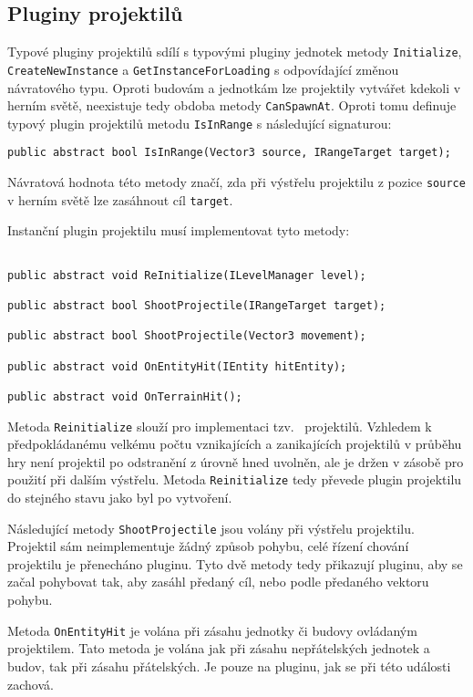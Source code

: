\subsection{Pluginy projektilů}
Typové pluginy projektilů sdílí s typovými pluginy jednotek metody \texttt{Initialize}, \texttt{CreateNewInstance} a \texttt{GetInstanceForLoading} s odpovídající změnou návratového typu. Oproti budovám a jednotkám lze projektily vytvářet kdekoli v herním světě, neexistuje tedy obdoba metody \texttt{CanSpawnAt}. Oproti tomu definuje typový plugin projektilů metodu \texttt{IsInRange} s následující signaturou:

\begin{lstlisting}
public abstract bool IsInRange(Vector3 source, IRangeTarget target);
\end{lstlisting}

Návratová hodnota této metody značí, zda při výstřelu projektilu z pozice \texttt{source} v herním světě lze zasáhnout cíl \texttt{target}.

Instanční plugin projektilu musí implementovat tyto metody:
\begin{lstlisting}

public abstract void ReInitialize(ILevelManager level);

public abstract bool ShootProjectile(IRangeTarget target);

public abstract bool ShootProjectile(Vector3 movement);

public abstract void OnEntityHit(IEntity hitEntity);

public abstract void OnTerrainHit();
\end{lstlisting}


Metoda \texttt{Reinitialize} slouží pro implementaci tzv.~ projektilů. Vzhledem k předpokládanému velkému počtu vznikajících a zanikajících projektilů v průběhu hry není projektil po odstranění z úrovně hned uvolněn, ale je držen v zásobě pro použití při dalším výstřelu. Metoda \texttt{Reinitialize} tedy převede plugin projektilu do stejného stavu jako byl po vytvoření.

Následující metody \texttt{ShootProjectile} jsou volány při výstřelu projektilu. Projektil sám neimplementuje žádný způsob pohybu, celé řízení chování projektilu je přenecháno pluginu. Tyto dvě metody tedy přikazují pluginu, aby se začal pohybovat tak, aby zasáhl předaný cíl, nebo podle předaného vektoru pohybu.

Metoda \texttt{OnEntityHit} je volána při zásahu jednotky či budovy ovládaným projektilem. Tato metoda je volána jak při zásahu nepřátelských jednotek a budov, tak při zásahu přátelských. Je pouze na pluginu, jak se při této události zachová.

